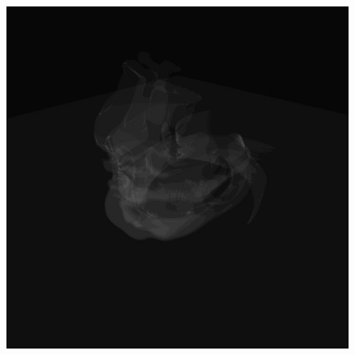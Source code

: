 \documentclass{egpubl}
\newlength{\boxheight}
\begin{document}
\begin{figure}[p]
\begin{minipage}[b][\boxheight][b]{0.24\linewidth}
\begin{minipage}[b]{0.98\linewidth}
    \end{minipage}%
  \end{minipage}%
  \hfill%
  \usebox\savedProteinBox
  \hfill%
  \begin{minipage}[b][\boxheight][b]{0.24\linewidth}
    \centering%
    \begin{minipage}[t]{0.98\linewidth}
      \centering
      \includegraphics[width=\linewidth]{snapshots/space/space_dci-wp64.jpg}%
    \end{minipage}%
    \vfill%
    \begin{minipage}[b]{0.98\linewidth}
      \centering

\end{minipage}
\end{minipage}
\end{figure}
\end{document}
